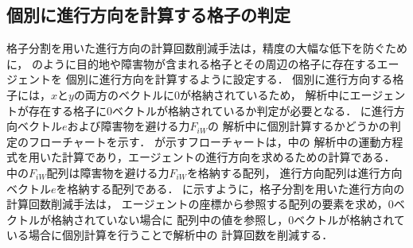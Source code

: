 \subsection{個別に進行方向を計算する格子の判定}
格子分割を用いた進行方向の計算回数削減手法は，精度の大幅な低下を防ぐために，
のように目的地や障害物が含まれる格子とその周辺の格子に存在するエージェントを
個別に進行方向を計算するように設定する．
個別に進行方向する格子には，$x$と$y$の両方のベクトルに0が格納されているため，
解析中にエージェントが存在する格子に0ベクトルが格納されているか判定が必要となる．
に進行方向ベクトル$e$および障害物を避ける力$F_{iW}$の
解析中に個別計算するかどうかの判定のフローチャートを示す．
が示すフローチャートは，中の
解析中の運動方程式を用いた計算であり，エージェントの進行方向を求めるための計算である．
中の$F_{iW}$配列は障害物を避ける力$F_{iW}$を格納する配列，
進行方向配列は進行方向ベクトル$e$を格納する配列である．
に示すように，格子分割を用いた進行方向の計算回数削減手法は，
エージェントの座標から参照する配列の要素を求め，0ベクトルが格納されていない場合に
配列中の値を参照し，0ベクトルが格納されている場合に個別計算を行うことで解析中の
計算回数を削減する．


\clearpage



